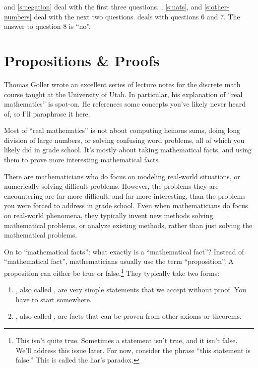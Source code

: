  and \cref{s:negation} deal with the first three
questions. , \cref{s:nats}, and \cref{s:other-numbers}
deal with the next two questions.  deals with
questions 6 and 7. The answer to question 8 is ``no''.

\section{Propositions \& Proofs}
\label{s:props-proofs}

Thomas Goller wrote an excellent series of lecture notes for the
discrete math course taught at the University of
Utah. \cite{goller-discrete} In particular, his explanation of ``real
mathematics'' is spot-on. He references some concepts you've likely
never heard of, so I'll paraphrase it here.

Most of ``real mathematics'' is not about computing heinous sums,
doing long division of large numbers, or solving confusing word
problems, all of which you likely did in grade school. It's mostly
about taking mathematical facts, and using them to prove more
interesting mathematical facts.

There are mathematicians who do focus on modeling real-world
situations, or numerically solving difficult problems. However, the
problems they are encountering are far more difficult, and far more
interesting, than the problems you were forced to address in grade
school. Even when mathematicians do focus on real-world phenomena,
they typically invent new methods solving mathematical problems, or
analyze existing methods, rather than just solving the mathematical
problems.

On to ``mathematical facts'': what exactly is a ``mathematical fact''?
Instead of ``mathematical fact'', mathematicians usually use the term
``proposition''. A proposition can either be true or
false.\footnote{This isn't quite true. Sometimes a statement isn't
  true, and it isn't false. We'll address this issue later. For now,
  consider the phrase ``this statement is false.'' This is called the
  liar's paradox.}  They typically take two forms:

\begin{enumerate}
\item {}, also called , are very simple
  statements that we accept without proof. You have to start
  somewhere.
\item {}, also called , are facts that can
  be proven from other axioms or theorems.
\end{enumerate}

